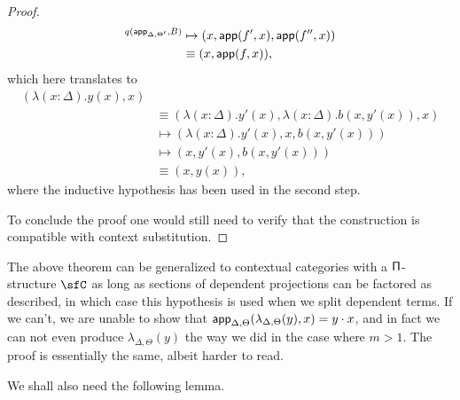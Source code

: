 \begin{proof}
\begin{align*}
    ^{q(\operatorname{\mathsf{app}}_{\Delta,\Theta'},B)}&\mapsto(x,\operatorname{\mathsf{app}}(f',x),\operatorname{\mathsf{app}}(f'',x)) \\
    &\equiv(x,\operatorname{\mathsf{app}}(f,x)),
  \end{align*}
  which here translates to
  \begin{align*}
    (\lambda(x:\Delta).y(x),x) \\
    &\equiv(\lambda(x:\Delta).y'(x),\lambda(x:\Delta).b(x,y'(x)),x) \\
    &\mapsto(\lambda(x:\Delta).y'(x),x,b(x,y'(x))) \\
    &\mapsto(x,y'(x),b(x,y'(x))) \\
    &\equiv(x,y(x)),
  \end{align*}
  where the inductive hypothesis has been used in the second step.

  To conclude the proof one would still need to verify that the construction is
  compatible with context substitution.
\end{proof}

\begin{rmk}
  The above theorem can be generalized to contextual categories with a
  $\operatorname{\mathsf{\Pi}}$-structure $\sfC$ as long as sections of dependent projections can be
  factored as described, in which case this hypothesis is used when we split
  dependent terms. If we can't, we are unable to show that
  $\operatorname{\mathsf{app}}_{\Delta,\Theta}(\lambda_{\Delta,\Theta}(y),x)=y\cdot x$, and in fact we
  can not even produce $\lambda_{\Delta,\Theta}(y)$ the way we did in the case
  where $m>1$. The proof is essentially the same, albeit harder to read.
\end{rmk}

We shall also need the following lemma.

